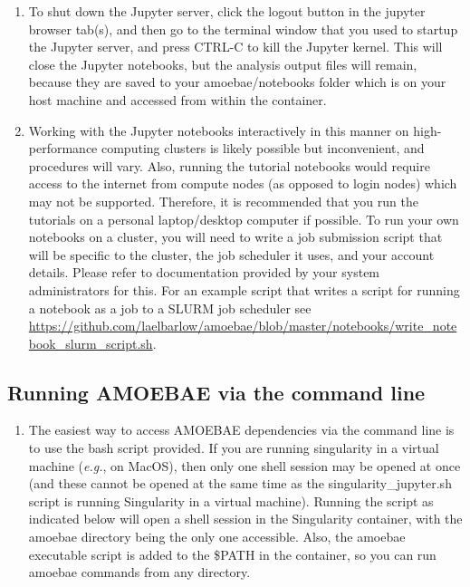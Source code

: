 \documentclass[12pt,letterpaper]{article}
\begin{document}
\begin{linenumbers}
\begin{enumerate}
\item To shut down the Jupyter server, click the logout button in the jupyter
    browser tab(s), and then go to the terminal window that you used to startup
    the Jupyter server, and press CTRL-C to kill the Jupyter kernel. This
    will close the Jupyter notebooks, but the analysis output files will
    remain, because they are saved to your amoebae/notebooks folder which is on
    your host machine and accessed from within the container.


\item Working with the Jupyter notebooks interactively in this manner on
    high-performance computing clusters is likely possible but inconvenient,
        and procedures will vary. Also, running the tutorial notebooks would
        require access to the internet from compute nodes (as opposed to login
        nodes) which may not be supported. Therefore, it is recommended that
        you run the tutorials on a personal laptop/desktop computer if
        possible. To run your own notebooks on a cluster, you will need to
        write a job submission script that will be specific to the cluster, the
        job scheduler it uses, and your account details. Please refer to
        documentation provided by your system administrators for this. For an
        example script that writes a script for running a notebook as a job to
        a SLURM job scheduler see
        \url{https://github.com/laelbarlow/amoebae/blob/master/notebooks/write_notebook_slurm_script.sh}.
        

\end{enumerate}


\subsection{Running AMOEBAE via the command line}
\label{shell_section}

\begin{enumerate}

\item The easiest way to access AMOEBAE dependencies via the command line is to
    use the bash script provided. If you are running singularity in a virtual
        machine (\textit{e.g.}, on MacOS), then only one shell session may be
        opened at once (and these cannot be opened at the same time as the
        singularity\_jupyter.sh script is running Singularity in a virtual
        machine). Running the script as indicated below will open a shell
        session in the Singularity container, with the amoebae directory being
        the only one accessible. Also, the amoebae executable script is added
        to the \$PATH in the container, so you can run amoebae commands from
        any directory.


\end{enumerate}
\end{linenumbers}
\end{document}
